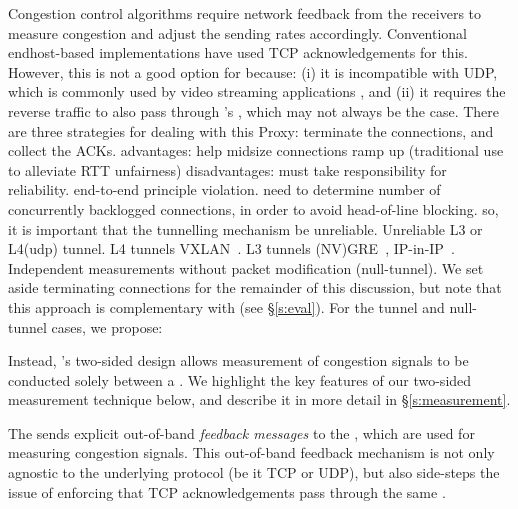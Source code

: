 \label{s:design:twosided}
\begin{outline}
\1 Congestion control algorithms require network feedback from the receivers to measure congestion and adjust the sending rates accordingly. 
    \2 Conventional endhost-based implementations have used TCP acknowledgements for this.
    \2 However, this is not a good option for \name because: 
(i) it is incompatible with UDP, which is commonly used by video streaming applications , 
and (ii) it requires the reverse traffic to also pass through \name's \inbox, which may not always be the case.  
\1 There are three strategies for dealing with this
    \2 Proxy: terminate the connections, and collect the ACKs.
        \3 advantages: help midsize connections ramp up (traditional use to alleviate RTT unfairness)
        \3 disadvantages: must take responsibility for reliability. end-to-end principle violation. need to determine number of concurrently backlogged connections, in order to avoid head-of-line blocking.
        \3 so, it is important that the tunnelling mechanism be unreliable.
    \2 Unreliable L3 or L4(udp) tunnel. 
        \3 L4 tunnels \eg VXLAN~\cite{vxlan}.
        \3 L3 tunnels \eg (NV)GRE~\cite{nvgre}, IP-in-IP~\cite{ipinip}.
    \2 Independent measurements without packet modification (null-tunnel).
\1 We set aside terminating connections for the remainder of this discussion, but note that this approach is complementary with \name (see \S\ref{s:eval}).
\1 For the tunnel and null-tunnel cases, we propose:
\end{outline}

 Instead, \name's two-sided design allows measurement of congestion signals to be conducted solely between a \pair. We highlight the key features of our two-sided measurement technique below, and describe it in more detail in \S\ref{s:measurement}. 

The \outbox sends explicit out-of-band \emph{feedback messages} to the \inbox, which are used for measuring congestion signals. 
This out-of-band feedback mechanism is not only agnostic to the underlying protocol (be it TCP or UDP), but also side-steps the issue of enforcing that TCP acknowledgements pass through the same \inbox.

